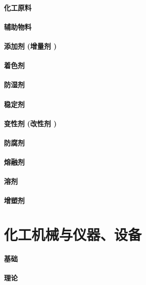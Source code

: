 \documentclass[UTF8]{../../ApplicationUniverse}
\begin{document}
\subsubsection{化工原料}
\subsubsection{辅助物料}
    \subsubsection{添加剂 (增量剂 )}
    \subsubsection{着色剂}
    \subsubsection{防湿剂}
    \subsubsection{稳定剂}
    \subsubsection{变性剂 (改性剂 )}
    \subsubsection{防腐剂}
    \subsubsection{熔融剂}
    \subsubsection{溶剂}
    \subsubsection{增塑剂}





\chapter{化工机械与仪器、设备}
\subsubsection{基础}
    \subsubsection{理论}
\end{document}
